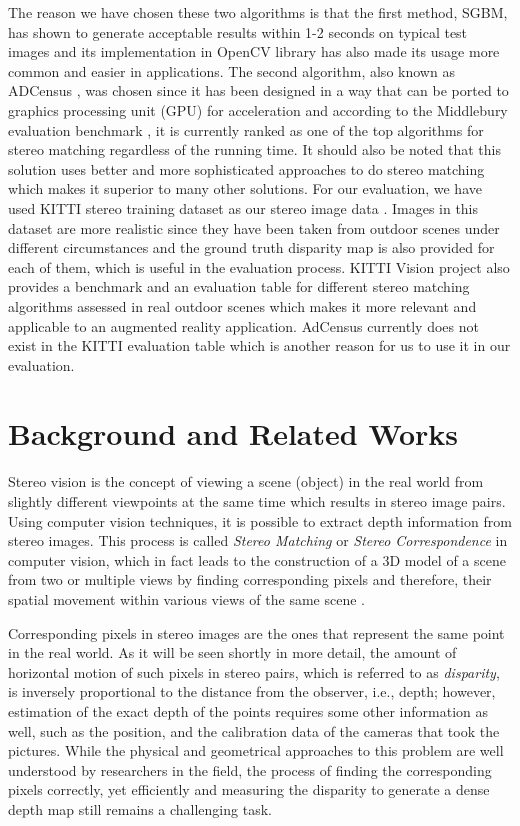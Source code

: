 \documentclass[dvips,letterpaper,12pt]{report}
\begin{document}
The reason we have chosen these two algorithms is that the first method, SGBM, has shown to generate acceptable results within 1-2 seconds on typical test images \cite{hir08} and 
its implementation in OpenCV library has also made its usage more common and easier in applications. The second algorithm, also known as ADCensus \cite{mei11}, was chosen since 
it has been designed in a way that
can be ported to graphics processing unit (GPU) for acceleration and according to the Middlebury evaluation benchmark \cite{mideval}, it is currently ranked as one of the top algorithms for 
stereo matching regardless of the running time.
It should also be noted that this solution uses better and more sophisticated approaches to do stereo matching which makes it superior to many other solutions. \newline
For our evaluation, we have used KITTI stereo training dataset as our stereo image data \cite{kitti}. 
Images in this dataset are more realistic since they have been taken from outdoor scenes under different circumstances 
and the ground truth disparity map is also provided for each of them, which is useful in the evaluation process. KITTI Vision project also provides a benchmark and an evaluation table
for different stereo
matching algorithms assessed in real outdoor scenes which makes it more relevant and applicable to an augmented reality application. 
AdCensus currently does not exist in the KITTI evaluation table which is another reason for us to use it in our evaluation.


\chapter{Background and Related Works}
Stereo vision is the concept of viewing a scene (object) in the real world from slightly different
viewpoints at the same time which results in stereo image pairs. Using computer vision techniques, it is possible to extract depth information from stereo
images. This process is called {\it Stereo Matching} or {\it Stereo Correspondence} in computer vision,
which in fact leads to the construction of a
3D model of a scene from two or multiple views by finding corresponding pixels and therefore, their spatial movement within various views of the same scene \cite{sze11}.

Corresponding pixels in stereo images are the ones that represent the same point in the real
world. As it will be seen shortly in more detail, the amount of horizontal motion of such pixels
in stereo pairs, which is referred to as {\it disparity}, is inversely proportional to the
distance from the observer, i.e., depth; however,  estimation of the exact depth of the points requires some
other information as well, such as the position, and the calibration data of the cameras that took the pictures.
While the physical and geometrical approaches to this problem are well understood by researchers in the field, the process of finding the corresponding pixels correctly, yet efficiently
and measuring the disparity to generate a dense depth map still remains a challenging task. \newline
\end{document}

